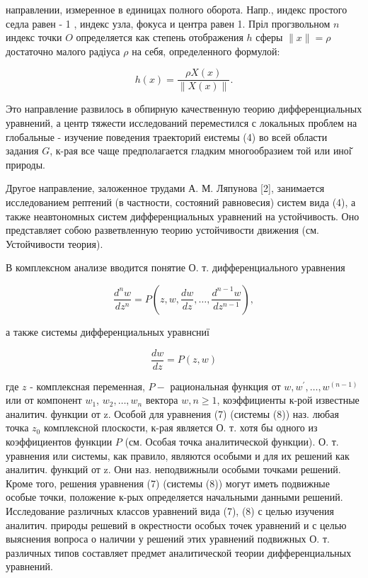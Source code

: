 \documentclass[10pt]{article}
\begin{document}
направлении, измеренное в единицах полного оборота. Напр., индекс простого седла равен - 1 , индекс узла, фокуса и центра равен 1. Пріл прогзвольном $n$ индекс точки $O$ определяется как степень отображения $h$ сферы $\|x\|=\rho$ достаточно малого радіуса $\rho$ на себя, определенного формулой:

\[
h(x)=\frac{\rho X(x)}{\|X(x)\|} .
\]

Это направление развилось в обпирную качественную теорию дифференциальных уравнений, а центр тяжести исследований переместился с локальных проблем на глобальные - изучение поведения траекторий еистемы (4) во всей области задания $G$, к-рая все чаще предполагается гладким многообразием той или иноі̆ природы.

Другое направление, заложенное трудами А. М. Ляпунова [2], занимается исследованием рептений (в частности, состояний равновесия) систем вида (4), а также неавтономных систем дифференциальных уравнений на устойчивость. Оно представляет собою разветвленную теорию устойчивости движения (см. Устойчивости теория).

В комплексном анализе вводится понятие О. т. дифференциального уравнения

\[
\frac{d^{n} w}{d z^{n}}=P\left(z, w, \frac{d w}{d z}, \ldots, \frac{d^{n-1} w}{d z^{n-1}}\right),
\]

а также системы дифференциальных уравнсниї

\[
\frac{d w}{d z}=P(z, w)
\]

где $z$ - комплексная переменная, $P-$ рациональная функция от $w, w^{\prime}, \ldots, w^{(n-1)}$ или от компонент $w_{1}$, $w_{2}, \ldots, w_{n}$ вектора $w, n \geqslant 1$, коэффициенты к-рой известные аналитич. функции от z. Особой для уравнения (7) (системы (8)) наз. любая точка $z_{0}$ комплексной плоскости, к-рая является О. т. хотя бы одного из коэффициентов функции $P$ (см. Особая точка аналитической функции). О. т. уравнения или системы, как правило, являются особыми и для их решений как аналитич. функций от z. Они наз. неподвижныли особыми точками решений. Кроме того, решения уравнения (7) (системы (8)) могут иметь подвижные особые точки, положение к-рых определяется начальными данными решений. Исследование различных классов уравнений вида (7), (8) с целью изучения аналитич. природы решевий в окрестности особых точек уравнений и с целью выяснения вопроса о наличии у решений этих уравнений подвижных О. т. различных типов составляет предмет аналитической теории дифференциальных уравнений.
\end{document}
